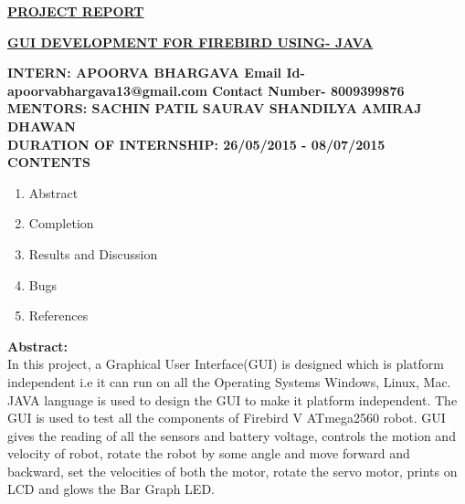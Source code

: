 \documentclass{article}
\begin{document}
	\begin{center}
		\color{red}\textbf{\underline{\Huge PROJECT REPORT}}
	\end{center}
	\vspace{1cm}
	\begin{center}
		\color{blue}\textbf{\underline{\LARGE GUI DEVELOPMENT FOR FIREBIRD USING- JAVA}}
	\end{center}
	\vspace{1cm}
	\textbf{INTERN: APOORVA BHARGAVA \newline Email Id- apoorvabhargava13@gmail.com \newline Contact Number- 8009399876}
	\vspace{1cm}
	\newline
	\textbf{MENTORS: SACHIN PATIL} \newline \textbf{SAURAV SHANDILYA} \newline  \textbf{AMIRAJ DHAWAN} \vspace{1cm} \\
	\textbf{DURATION OF INTERNSHIP: 26/05/2015 - 08/07/2015}
	\newpage
	\textbf{\huge CONTENTS }
	\vspace{1cm}
	\begin{enumerate}
		\item \large Abstract \vspace{0.5cm}
		\item \large Completion \vspace{0.5cm}
		\item \large Results and Discussion \vspace{0.5cm}
		\item \large Bugs \vspace{0.5cm}
		\item \large References \vspace{0.5cm}
	\end{enumerate}
	\newpage
	\textbf {\huge Abstract:} \vspace{1cm} \\ 
	In this project, a Graphical User Interface(GUI) is designed which is platform independent i.e it can run on all the Operating Systems Windows, Linux, Mac. JAVA language is used to design the GUI to make it platform independent. The GUI is used to test all the components of Firebird V ATmega2560 robot. GUI gives the reading of all the sensors and battery voltage, controls the motion and velocity of robot, rotate the robot by some angle and move forward and backward, set the velocities of both the motor, rotate the servo motor, prints on LCD and glows the Bar Graph LED.
\end{document}
